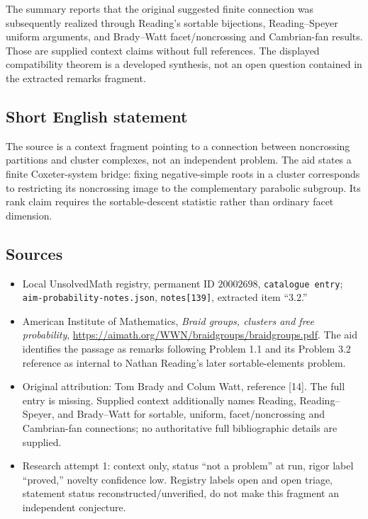 \documentclass[11pt]{article}
\begin{document}
The summary reports that the original suggested finite connection was subsequently realized through Reading's sortable bijections, Reading--Speyer uniform arguments, and Brady--Watt facet/noncrossing and Cambrian-fan results. Those are supplied context claims without full references. The displayed compatibility theorem is a developed synthesis, not an open question contained in the extracted remarks fragment.
\subsection{Short English statement}
The source is a context fragment pointing to a connection between noncrossing partitions and cluster complexes, not an independent problem. The aid states a finite Coxeter-system bridge: fixing negative-simple roots in a cluster corresponds to restricting its noncrossing image to the complementary parabolic subgroup. Its rank claim requires the sortable-descent statistic rather than ordinary facet dimension.
\subsection{Sources}
\begin{itemize}
\item Local UnsolvedMath registry, permanent ID $20002698$, \texttt{catalogue entry}; \texttt{aim-probability-notes.json}, \texttt{notes[139]}, extracted item ``3.2.''
\item American Institute of Mathematics, \emph{Braid groups, clusters and free probability}, \url{https://aimath.org/WWN/braidgroups/braidgroups.pdf}. The aid identifies the passage as remarks following Problem 1.1 and its Problem 3.2 reference as internal to Nathan Reading's later sortable-elements problem.
\item Original attribution: Tom Brady and Colum Watt, reference [14]. The full entry is missing. Supplied context additionally names Reading, Reading--Speyer, and Brady--Watt for sortable, uniform, facet/noncrossing and Cambrian-fan connections; no authoritative full bibliographic details are supplied.
\item Research attempt 1: context only, status ``not a problem'' at run, rigor label ``proved,'' novelty confidence low. Registry labels open and open triage, statement status reconstructed/unverified, do not make this fragment an independent conjecture.
\end{itemize}
\end{document}
